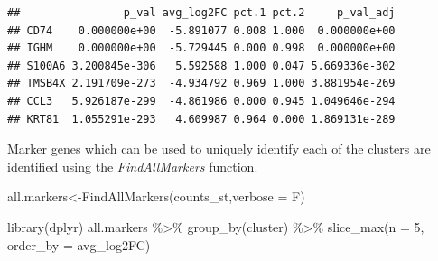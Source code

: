 \documentclass[
]{book}
\newenvironment{Shaded}{\begin{snugshade}}{\end{snugshade}}
\newcommand{\AttributeTok}[1]{\textcolor[rgb]{0.77,0.63,0.00}{#1}}
\newcommand{\DecValTok}[1]{\textcolor[rgb]{0.00,0.00,0.81}{#1}}
\newcommand{\FunctionTok}[1]{\textcolor[rgb]{0.00,0.00,0.00}{#1}}
\newcommand{\NormalTok}[1]{#1}
\newcommand{\OtherTok}[1]{\textcolor[rgb]{0.56,0.35,0.01}{#1}}
\newcommand{\SpecialCharTok}[1]{\textcolor[rgb]{0.00,0.00,0.00}{#1}}
\begin{document}
\begin{Shaded}
\end{Shaded}

\begin{verbatim}
##                p_val avg_log2FC pct.1 pct.2     p_val_adj
## CD74    0.000000e+00  -5.891077 0.008 1.000  0.000000e+00
## IGHM    0.000000e+00  -5.729445 0.000 0.998  0.000000e+00
## S100A6 3.200845e-306   5.592588 1.000 0.047 5.669336e-302
## TMSB4X 2.191709e-273  -4.934792 0.969 1.000 3.881954e-269
## CCL3   5.926187e-299  -4.861986 0.000 0.945 1.049646e-294
## KRT81  1.055291e-293   4.609987 0.964 0.000 1.869131e-289
\end{verbatim}

Marker genes which can be used to uniquely identify each of the clusters are identified using the \emph{FindAllMarkers} function.

\begin{Shaded}
\begin{Highlighting}[]
\NormalTok{all.markers}\OtherTok{\textless{}{-}}\FunctionTok{FindAllMarkers}\NormalTok{(counts\_st,}\AttributeTok{verbose =}\NormalTok{ F)}
\end{Highlighting}
\end{Shaded}

\begin{Shaded}
\begin{Highlighting}[]
\FunctionTok{library}\NormalTok{(dplyr)}
\NormalTok{all.markers }\SpecialCharTok{\%\textgreater{}\%}
    \FunctionTok{group\_by}\NormalTok{(cluster) }\SpecialCharTok{\%\textgreater{}\%}
    \FunctionTok{slice\_max}\NormalTok{(}\AttributeTok{n =} \DecValTok{5}\NormalTok{, }\AttributeTok{order\_by =}\NormalTok{ avg\_log2FC)}
\end{Highlighting}
\end{Shaded}
\end{document}

